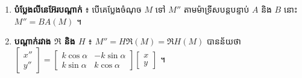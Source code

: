 \begin{note}[មេរៀនសង្ខេប]
\begin{enumerate}[1]
\begin{itemize}
    \item បំប្លែងវិលនៃមុំ $\alpha$ ៖ $\mathfrak{R} = \begin{bmatrix} \cos\alpha & -\sin\alpha\\ \sin\alpha & \cos\alpha \end{bmatrix}$ ។ ករណី $\alpha = 180^\circ$ នោះ $\mathfrak{R} = S_O$ ។ ករណី $\alpha = 360^\circ$ នោះ $\mathfrak{R} = I$ ។ បំប្លែងវិលមានម៉ាទ្រីសច្រាស $\mathfrak{R}^{-1} = \begin{bmatrix} \cos\alpha & \sin\alpha\\ -\sin\alpha & \cos\alpha \end{bmatrix}$ ។
  \end{itemize}
  \item \textbf{បំប្លែងលីនេអ៊ែរបណ្ដាក់} ៖ បើគេប្លែងចំណុច $M$ ទៅ $M''$ តាមម៉ាទ្រីសបន្តបន្ទាប់ $A$ និង $B$ នោះ $M'' = BA(M)$ ។
  \item \textbf{បណ្ដាក់រវាង $\mathfrak{R}$ និង $H$} ៖ $M'' = H\mathfrak{R}(M) = \mathfrak{R}H(M)$ បានន័យថា $\begin{bmatrix} x''\\ y'' \end{bmatrix} = \begin{bmatrix} k\cos\alpha & -k\sin\alpha\\ k\sin\alpha & k\cos\alpha \end{bmatrix}\begin{bmatrix} x\\ y \end{bmatrix}$ ។
\end{enumerate}
\end{note}

